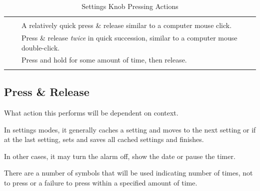 \begin{table}[H]
\begin{tabu}{ X[2,c,m] | X[1,c,m] | X[4,l,m] }
  \thrule
   &  &  \\ \mrule
  \hyperref[Press and Release]{}
    &  & A relatively quick press \& release
    similar to a computer mouse click. \\ 
  \hyperref[Double-Click]{}
    &  & Press \& release \textit{twice} in quick
    succession, similar to a computer mouse double-click. \\ 
  \hyperref[Press and Hold]{}
    &  & Press and hold for some amount of time,
    then release. \\
  \bhrule
\end{tabu}
\caption {Settings Knob Pressing Actions}
\end{table}

\subsection{Press \& Release} \label{Press and Release}

What action this performs will be dependent on context.

\par\medskip

In settings modes, it generally caches a setting and moves to the next setting
or if at the last setting, sets and saves all cached settings and finishes.

\par\medskip

In other cases, it may turn the alarm off, show the date or pause the timer.

\par\medskip

There are a number of symbols that will be used indicating number of times, not
to press or a failure to press within a specified amount of time.

